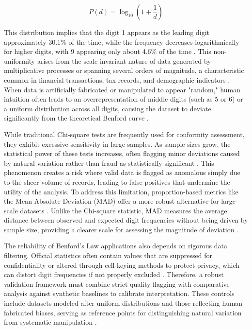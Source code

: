 \documentclass[11pt,a4paper]{article}
\begin{document}
$$ P(d) = \log_{10}\left(1 + \frac{1}{d}\right) $$

This distribution implies that the digit 1 appears as the leading digit approximately 30.1\% of the time, while the frequency decreases logarithmically for higher digits, with 9 appearing only about 4.6\% of the time \cite{Ivanova2025BenfordsLA}. This non-uniformity arises from the scale-invariant nature of data generated by multiplicative processes or spanning several orders of magnitude, a characteristic common in financial transactions, tax records, and demographic indicators \cite{Cerqueti2021SomeNT}. When data is artificially fabricated or manipulated to appear "random," human intuition often leads to an overrepresentation of middle digits (such as 5 or 6) or a uniform distribution across all digits, causing the dataset to deviate significantly from the theoretical Benford curve \cite{Azevedo2021ABL}.

While traditional Chi-square tests are frequently used for conformity assessment, they exhibit excessive sensitivity in large samples. As sample sizes grow, the statistical power of these tests increases, often flagging minor deviations caused by natural variation rather than fraud as statistically significant \cite{Schumm2023CanRS}. This phenomenon creates a risk where valid data is flagged as anomalous simply due to the sheer volume of records, leading to false positives that undermine the utility of the analysis. To address this limitation, proportion-based metrics like the Mean Absolute Deviation (MAD) offer a more robust alternative for large-scale datasets \cite{Silva2024ANA}. Unlike the Chi-square statistic, MAD measures the average distance between observed and expected digit frequencies without being driven by sample size, providing a clearer scale for assessing the magnitude of deviation \cite{Pinsky2025ComputationAI}.

The reliability of Benford's Law applications also depends on rigorous data filtering. Official statistics often contain values that are suppressed for confidentiality or altered through cell-keying methods to protect privacy, which can distort digit frequencies if not properly excluded \cite{Schafer2005AutomatieIO}. Therefore, a robust validation framework must combine strict quality flagging with comparative analysis against synthetic baselines to calibrate interpretation. These controls include datasets modeled after uniform distributions and those reflecting human-fabricated biases, serving as reference points for distinguishing natural variation from systematic manipulation \cite{Cole2019TestingTE}.
\end{document}
